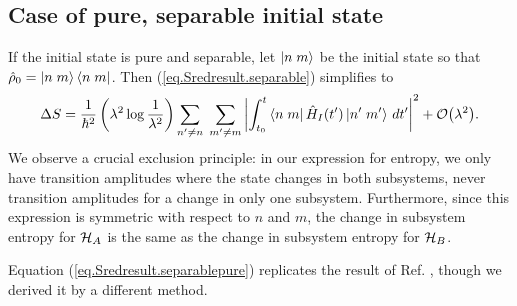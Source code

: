 \subsection{Case of pure, separable initial state}\label{sec.purestate}

If the initial state is pure and separable, let \(\left|n\;m\right\rangle\) be the initial state so that \(\hat{\rho}_0 = \left|n\;m\right\rangle\left\langle n\;m\right|\). Then (\ref{eq.Sredresult.separable}) simplifies to
\begin{equation}\label{eq.Sredresult.separablepure}
\Delta S =\frac{1}{\hbar^2}\left(\lambda^2 \log\frac{1}{\lambda^2}\right) \sum_{n^\prime\neq n} \;\sum_{m^\prime\neq m} \left|\int_{t_0}^t \left\langle n\;m\right| \hat{H}_I (t^{\prime})\left|n^\prime\;m^\prime\right\rangle \,dt^{\prime}\right|^2 + \mathcal{O}{\left(\lambda^2\right)}.
\end{equation}
We observe a crucial exclusion principle: in our expression for entropy, we only have transition amplitudes where the state changes in both subsystems, never transition amplitudes for a change in only one subsystem. Furthermore, since this expression is symmetric with respect to \(n\) and \(m\), the change in subsystem entropy for \(\mathcal{H}_A\) is the same as the change in subsystem entropy for \(\mathcal{H}_B\).

Equation (\ref{eq.Sredresult.separablepure}) replicates the result of Ref. \cite{seki}, though we derived it by a different method.
